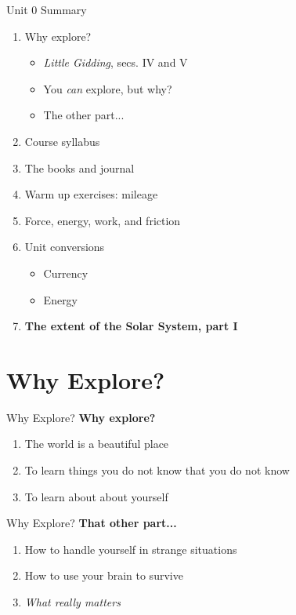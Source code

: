 \documentclass{beamer}
\begin{document}
\begin{frame}{Unit 0 Summary}
\begin{enumerate}
\item Why explore?
\begin{itemize}
\item \textit{Little Gidding}, secs. IV and V
\item You \textit{can} explore, but why?
\item The other part...
\end{itemize}
\item Course syllabus
\item The books and journal
\item Warm up exercises: mileage
\item Force, energy, work, and friction
\item Unit conversions
\begin{itemize}
\item Currency
\item Energy
\end{itemize}
\item \textbf{The extent of the Solar System, part I}
\end{enumerate}
\end{frame}

\section{Why Explore?}

\begin{frame}{Why Explore?}
\textbf{Why explore?}
\begin{enumerate}
\item The world is a beautiful place
\item To learn things you do not know that you do not know
\item To learn about about yourself
\end{enumerate}
\end{frame}

\begin{frame}{Why Explore?}
\textbf{That other part...}
\begin{enumerate}
\item How to handle yourself in strange situations
\item How to use your brain to survive
\item \textit{What really matters}
\end{enumerate}
\end{frame}
\end{document}
